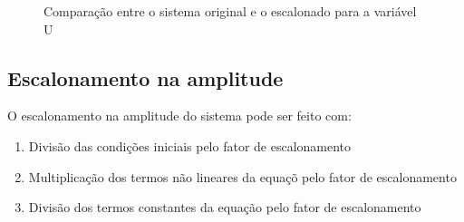 \documentclass[12pt]{article}
\begin{document}
    \begin{figure}[H]
        \caption{Comparação entre o sistema original e o escalonado para a variável U}
    \end{figure}


    \subsection{Escalonamento na amplitude}
    O escalonamento na amplitude do sistema pode ser feito com:
    \begin{enumerate}
        \item Divisão das condições iniciais pelo fator de escalonamento
        \item Multiplicação dos termos não lineares da equaçõ pelo fator de escalonamento
        \item Divisão dos termos constantes da equação pelo fator de escalonamento
    \end{enumerate}
\end{document}
